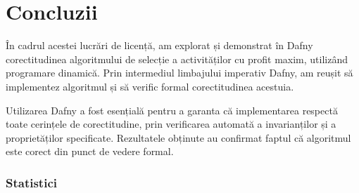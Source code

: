 \chapter*{Concluzii} 
În cadrul acestei lucrări de licență, am explorat și demonstrat în Dafny corectitudinea algoritmului de selecție a activităților cu profit maxim, utilizând programare dinamică. Prin intermediul limbajului imperativ Dafny, am reușit să implementez algoritmul și să verific formal corectitudinea acestuia.
 
Utilizarea Dafny a fost esențială pentru a garanta că implementarea respectă toate cerințele de corectitudine, prin verificarea automată a invarianților și a proprietăților specificate.
Rezultatele obținute au confirmat faptul că algoritmul este corect din punct de vedere formal.

\subsection{Statistici}

